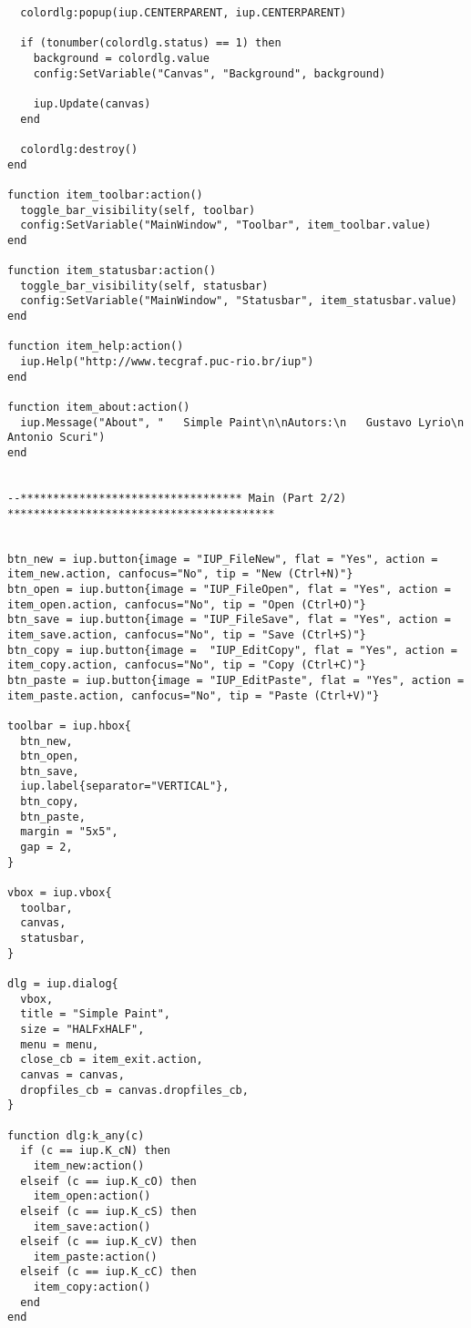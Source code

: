 \documentclass{ctexart}
\begin{document}
\begin{lstlisting}
  colordlg:popup(iup.CENTERPARENT, iup.CENTERPARENT)

  if (tonumber(colordlg.status) == 1) then
    background = colordlg.value
    config:SetVariable("Canvas", "Background", background)

    iup.Update(canvas)
  end

  colordlg:destroy()
end

function item_toolbar:action()
  toggle_bar_visibility(self, toolbar)
  config:SetVariable("MainWindow", "Toolbar", item_toolbar.value)
end

function item_statusbar:action()
  toggle_bar_visibility(self, statusbar)
  config:SetVariable("MainWindow", "Statusbar", item_statusbar.value)
end

function item_help:action()
  iup.Help("http://www.tecgraf.puc-rio.br/iup")
end

function item_about:action()
  iup.Message("About", "   Simple Paint\n\nAutors:\n   Gustavo Lyrio\n   Antonio Scuri")
end


--********************************** Main (Part 2/2) *****************************************


btn_new = iup.button{image = "IUP_FileNew", flat = "Yes", action = item_new.action, canfocus="No", tip = "New (Ctrl+N)"}
btn_open = iup.button{image = "IUP_FileOpen", flat = "Yes", action = item_open.action, canfocus="No", tip = "Open (Ctrl+O)"}
btn_save = iup.button{image = "IUP_FileSave", flat = "Yes", action = item_save.action, canfocus="No", tip = "Save (Ctrl+S)"}
btn_copy = iup.button{image =  "IUP_EditCopy", flat = "Yes", action = item_copy.action, canfocus="No", tip = "Copy (Ctrl+C)"}
btn_paste = iup.button{image = "IUP_EditPaste", flat = "Yes", action = item_paste.action, canfocus="No", tip = "Paste (Ctrl+V)"}

toolbar = iup.hbox{
  btn_new,
  btn_open,
  btn_save,
  iup.label{separator="VERTICAL"},
  btn_copy,
  btn_paste,
  margin = "5x5",
  gap = 2,
}

vbox = iup.vbox{
  toolbar,
  canvas,
  statusbar,
}

dlg = iup.dialog{
  vbox,
  title = "Simple Paint",
  size = "HALFxHALF",
  menu = menu,
  close_cb = item_exit.action,
  canvas = canvas,
  dropfiles_cb = canvas.dropfiles_cb,
}

function dlg:k_any(c)
  if (c == iup.K_cN) then
    item_new:action()
  elseif (c == iup.K_cO) then
    item_open:action()
  elseif (c == iup.K_cS) then
    item_save:action()
  elseif (c == iup.K_cV) then
    item_paste:action()  
  elseif (c == iup.K_cC) then
    item_copy:action()  
  end
end


\end{lstlisting}
\end{document}
